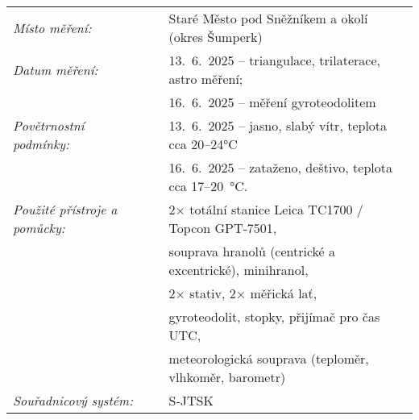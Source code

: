 
\begin{tabular}{lll} 
\textit{Místo měření:} & & Staré Město pod Sněžníkem a okolí (okres Šumperk)\\ 
\textit{Datum měření:} & & 13.~6.~2025 – triangulace, trilaterace, astro měření;\\
& & 16.~6.~2025 – měření gyroteodolitem\\
\textit{Povětrnostní podmínky:} & & 13.~6.~2025 – jasno, slabý vítr, teplota cca 20–24°C\\
 & & 16.~6.~2025 – zataženo, deštivo,  teplota cca 17–20~°C.\\
\textit{Použité přístroje a pomůcky:} & & 2× totální stanice Leica TC1700 / Topcon GPT‑7501,\\
& & souprava hranolů (centrické a excentrické), minihranol,\\
& & 2× stativ, 2× měřická lať,\\
& & gyroteodolit, stopky, přijímač pro čas UTC,\\
& & meteorologická souprava (teploměr, vlhkoměr, barometr)\\
\textit{Souřadnicový systém:} & & S‑JTSK\\ 
\end{tabular}
